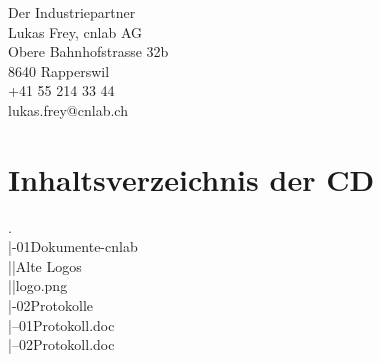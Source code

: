 Der Industriepartner\\
Lukas Frey, cnlab AG\\
Obere Bahnhofstrasse 32b\\
8640 Rapperswil\\
+41 55 214 33 44\\
lukas.frey@cnlab.ch

\section{Inhaltsverzeichnis der CD}
.\\
|-01Dokumente-cnlab\\
||Alte Logos\\
||logo.png\\
|-02Protokolle\\
|--01Protokoll.doc\\
|--02Protokoll.doc\\

